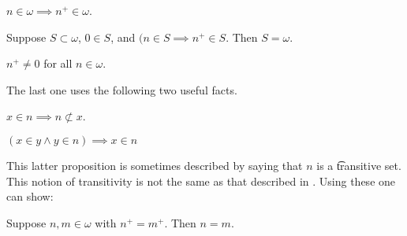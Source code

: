 \begin{proposition}
$n \in \omega \implies n^+ \in \omega$.
\end{proposition}

\begin{proposition}
Suppose $S \subset \omega$, $0 \in S$, and $(n \in S \implies n^+ \in S$.
Then $S = \omega$.
\end{proposition}

\begin{proposition}
$n^+ \neq 0$ for all $n \in \omega$.
\end{proposition}

The last one uses the following two useful facts.

\begin{proposition}
$x \in n \implies n \not\subset x$.
\end{proposition}

\begin{proposition}
$(x \in y \land y \in n) \implies x \in n$
\end{proposition}

This latter proposition is sometimes described by saying that $n$ is a \t{transitive set}.
This notion of transitivity is not the same as that described in .
Using these one can show:

\begin{proposition}
Suppose $n, m \in \omega$ with $n^+ = m^+$.
Then $n = m$.
\end{proposition}
